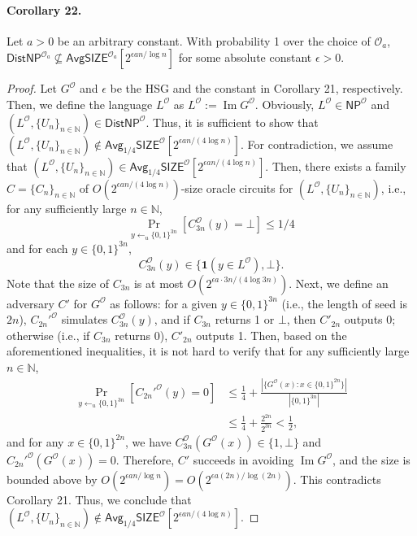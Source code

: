 \paragraph{Corollary 22.}
Let $a>0$ be an arbitrary constant. With probability 1 over the choice of $\mathcal O_a$, $\mathsf{DistNP}^{\mathcal O_a}\not\subseteq\mathsf{AvgSIZE}^{\mathcal O_a}[2^{\epsilon an/\log n}]$ for some absolute constant $\epsilon>0$.
\begin{proof}
Let $G^{\mathcal O}$ and $\epsilon$ be the HSG and the constant in Corollary 21, respectively. Then, we define the language $L^{\mathcal O}$ as $L^{\mathcal O}:=\operatorname{Im}G^{\mathcal O}$. Obviously, $L^{\mathcal O}\in\mathsf{NP}^{\mathcal O}$ and $(L^{\mathcal O},\{U_n\}_{n\in\mathbb N})\in\mathsf{DistNP}^{\mathcal O}$. Thus, it is sufficient to show that $(L^{\mathcal O},\{U_n\}_{n\in\mathbb N})\notin\mathsf{Avg}_{1/4}\mathsf{SIZE}^{\mathcal O}[2^{\epsilon an/(4\log n)}]$.
For contradiction, we assume that $(L^{\mathcal O},\{U_n\}_{n\in\mathbb N})\in\mathsf{Avg}_{1/4}\mathsf{SIZE}^{\mathcal O}[2^{\epsilon an/(4\log n)}]$. Then, there exists a family $C=\{C_n\}_{n\in\mathbb N}$ of $O(2^{\epsilon an/(4\log n)})$-size oracle circuits for $(L^{\mathcal O},\{U_n\}_{n\in\mathbb N})$, i.e., for any sufficiently large $n\in\mathbb N$,
\[\Pr_{y\leftarrow_u\{0,1\}^{3n}}[C_{3n}^{\mathcal O}(y)=\bot]\leq1/4\]
and for each $y\in\{0,1\}^{3n}$,
\[C_{3n}^{\mathcal O}(y)\in\{\mathbf1(y\in L^{\mathcal O}),\bot\}.\]
Note that the size of $C_{3n}$ is at most $O(2^{\epsilon a\cdot3n/(4\log3n)})$.
Next, we define an adversary $C'$ for $G^{\mathcal O}$ as follows: for a given $y\in\{0,1\}^{3n}$ (i.e., the length of seed is $2n$), $C_{2n}'^{\mathcal O}$ simulates $C_{3n}^{\mathcal O}(y)$, and if $C_{3n}$ returns 1 or $\bot$, then $C'_{2n}$ outputs 0; otherwise (i.e., if $C_{3n}$ returns 0), $C'_{2n}$ outputs 1. Then, based on the aforementioned inequalities, it is not hard to verify that for any sufficiently large $n\in\mathbb N$,
\begin{align*}
\Pr_{y\leftarrow_u\{0,1\}^{3n}}[C_{2n}'^{\mathcal O}(y)=0]
&\leq\frac14+\frac{|\{G^{\mathcal O}(x):x\in\{0,1\}^{2n}\}|}{|\{0,1\}^{3n}|}\\
&\leq\frac14+\frac{2^{2n}}{2^{3n}}<\frac12,
\end{align*}
and for any $x\in\{0,1\}^{2n}$, we have $C_{3n}^{\mathcal O}(G^{\mathcal O}(x))\in\{1,\bot\}$ and $C_{2n}'^{\mathcal O}(G^{\mathcal O}(x))=0$.
Therefore, $C'$ succeeds in avoiding $\operatorname{Im}G^{\mathcal O}$, and the size is bounded above by $O(2^{\epsilon an/\log n})=O(2^{\epsilon a(2n)/\log(2n)})$. This contradicts Corollary 21. Thus, we conclude that $(L^{\mathcal O},\{U_n\}_{n\in\mathbb N})\notin\mathsf{Avg}_{1/4}\mathsf{SIZE}^{\mathcal O}[2^{\epsilon an/(4\log n)}]$.
\end{proof}
